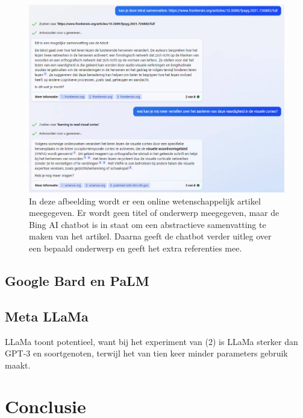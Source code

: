 \begin{figure}[H]
	\includegraphics{img/bing-ai-chatbot-example.png}
	\caption{In deze afbeelding wordt er een online wetenschappelijk artikel meegegeven. Er wordt geen titel of onderwerp meegegeven, maar de Bing AI chatbot is in staat om een abstractieve samenvatting te maken van het artikel. Daarna geeft de chatbot verder uitleg over een bepaald onderwerp en geeft het extra referenties mee.}
\end{figure}





\subsection{Google Bard en PaLM}



\subsection{Meta LLaMa}



LLaMa toont potentieel, want bij het experiment van (2) is LLaMa sterker dan GPT-3 en soortgenoten, terwijl het van tien keer minder parameters gebruik maakt.


\section{Conclusie}

